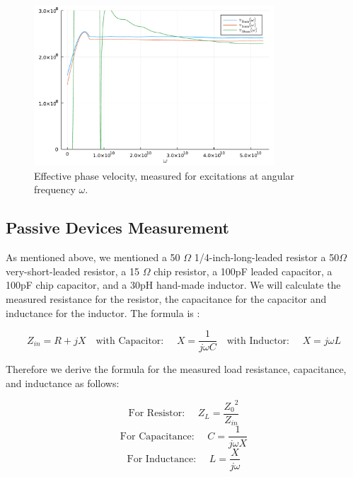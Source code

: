 \documentclass{article}
\begin{document}
\begin{figure}[H]
  \includegraphics[width=0.8\textwidth]{figures/build/phase_vel.pdf}
  \caption{Effective phase velocity, measured for excitations at angular frequency $\omega$.}
  \label{fig:phasevel}
\end{figure}

\subsection{Passive Devices Measurement}

\begin{flushleft}
As mentioned above, we mentioned a 50 $\Omega$ 1/4-inch-long-leaded resistor a 50$\Omega$ very-short-leaded resistor, a 15 $\Omega$ chip resistor, a 100pF leaded capacitor, a 100pF chip capacitor, and a 30pH hand-made inductor. We will calculate the measured resistance for the resistor, the capacitance for the capacitor and inductance for the inductor. The formula is :
\end{flushleft}

\begin{equation}
    Z_{in} = R + jX 
    \quad \text{with Capacitor: } \quad X= \frac{1}{j\omega C}
    \quad \text{with Inductor: } \quad X= j \omega L
\end{equation}

\begin{flushleft}
Therefore we derive the formula for the measured load resistance, capacitance, and inductance as follows:
\end{flushleft}

\begin{equation}
      \quad \text{For Resistor: }\quad 
    Z_L = \frac{{Z_0}^2}{Z_{in}} \quad
\end{equation}
\begin{equation}
    \quad \text{For Capacitance: }\quad 
    C = \frac{1}{j \omega X} \quad
\end{equation}    
\begin{equation}
    \quad \text{For Inductance: }\quad
    L = \frac{X}{j \omega} \quad
\end{equation}
\end{document}
